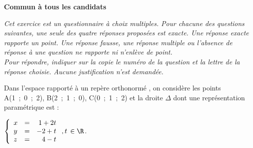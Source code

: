 
\textbf{Commun à tous les candidats}

\medskip

\emph{Cet exercice est un questionnaire à choix multiples. Pour chacune des questions suivantes, une seule des quatre réponses proposées est exacte. Une réponse exacte rapporte un point. Une réponse fausse, une réponse multiple ou l'absence de réponse à une question ne rapporte ni n'enlève de point.\\[5pt]
 Pour répondre, indiquer sur la copie le numéro de la question et la lettre de la réponse choisie. Aucune justification n'est demandée.}

\medskip

Dans l'espace rapporté à un repère orthonormé \Oijk, on considère les points A(1~;~0~;~2), B(2~;~1~;~0), C(0~;~1~;~2) et la droite $\Delta$ dont une représentation paramétrique est :

$\left\{\begin{array}{l c r}
x &=& 1 + 2t\\
y &=& -2 + t\\ 
z&=&4 - t
\end{array}\right., t\, \in \R$.

\medskip

